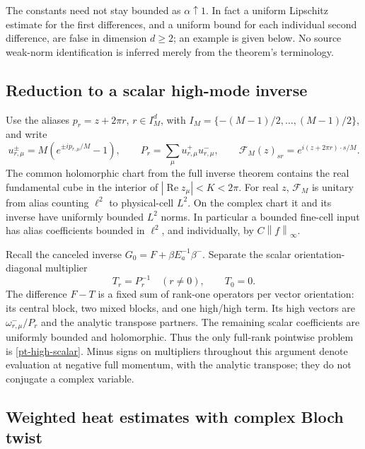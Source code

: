 \documentclass[11pt]{article}
\newcommand{\norm}[1]{\left\lVert#1\right\rVert}
\begin{document}
The constants need not stay bounded as $\alpha\uparrow1$. In fact a
uniform Lipschitz estimate for the first differences, and a uniform
bound for each individual second difference, are false in dimension
$d\ge2$; an example is given below. No source weak-norm identification
is inferred merely from the theorem's terminology.

\subsection{Reduction to a scalar high-mode inverse}

Use the aliases $p_r=z+2\pi r$, $r\in I_M^d$, with
$I_M=\{-(M-1)/2,\ldots,(M-1)/2\}$, and write
\begin{equation}\label{pt-alias-data}
 u_{r,\mu}^{\pm}=M(e^{\pm ip_{r,\mu}/M}-1),\qquad
 P_r=\sum_\mu u_{r,\mu}^+u_{r,\mu}^-,\qquad
 \mathcal F_M(z)_{sr}=e^{i(z+2\pi r)\cdot s/M}.
\end{equation}
The common holomorphic chart from the full inverse theorem contains
the real fundamental cube in the interior of $|\operatorname{Re}z_\mu|<K<2\pi$.
For real $z$, $\mathcal F_M$ is unitary from alias counting $\ell^2$
to physical-cell $L^2$. On the complex chart it and its inverse have
uniformly bounded $L^2$ norms. In particular a bounded fine-cell input
has alias coefficients bounded in $\ell^2$, and individually, by
$C\norm{f}_\infty$.

Recall the canceled inverse $G_0=F+\beta E_a^{-1}\beta^-$.
Separate the scalar orientation-diagonal multiplier
\begin{equation}\label{pt-high-scalar}
 T_r=P_r^{-1}\quad(r\ne0),\qquad T_0=0.
\end{equation}
The difference $F-T$ is a fixed sum of rank-one operators per vector
orientation: its central block, two mixed blocks, and one high/high
term. Its high vectors are $\omega_{r,\mu}^-/P_r$ and the analytic
transpose partners. The remaining scalar coefficients are uniformly
bounded and holomorphic. Thus the only full-rank pointwise problem is
\eqref{pt-high-scalar}. Minus signs on multipliers throughout this
argument denote evaluation at negative full momentum, with the
analytic transpose; they do not conjugate a complex variable.

\subsection{Weighted heat estimates with complex Bloch twist}
\end{document}
